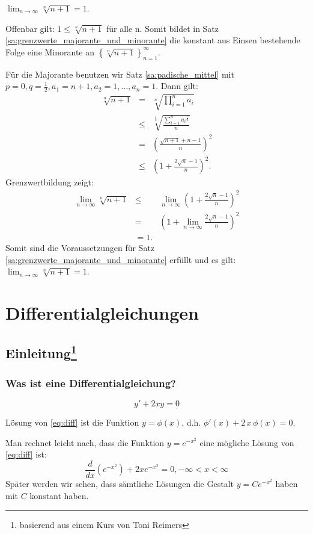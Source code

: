 \documentclass[10pt]{scrbook}
\begin{document}
\begin{Le}
$\lim_{n\rightarrow\infty} \sqrt[n]{n+1} = 1$.
\end{Le}
\begin{bew}
Offenbar gilt: $1\leq \sqrt[n]{n+1}$ für alle n. Somit bildet in Satz \ref{sa:grenzwerte_majorante_und_minorante} die konstant aus Einsen bestehende Folge eine Minorante an $\left\{\sqrt[n]{n+1}\right\}_{n=1}^\infty$.

Für die Majorante benutzen wir Satz \ref{sa:padische_mittel} mit $p=0, q=\frac{1}{2}, a_1={n+1}, a_2=1, \ldots, a_n=1$. Dann gilt:
\begin{eqnarray*}
\sqrt[n]{n+1} & = & \sqrt[n]{\prod_{i=1}^n a_i} \\
& \leq & \sqrt[\frac{1}{2}]{\frac{\sum_{i=1}^n {a_i}^{\frac{1}{2}}}{n}} \\
& = & \left(\frac{\sqrt{n+1} + n-1}{n}\right)^2 \\
& \leq & \left(1+\frac{2 \sqrt{n}-1}{n}\right)^2.
\end{eqnarray*}
Grenzwertbildung zeigt:
\begin{eqnarray*} 
\lim_{n\rightarrow\infty} \sqrt[n]{n+1} & \leq & \lim_{n\rightarrow\infty}\left(1+\frac{2 \sqrt{n}-1}{n}\right)^2 \\
& = & \left(1+\lim_{n\rightarrow\infty} \frac{2 \sqrt{n}-1}{n}\right)^2 \\
& = 1.
\end{eqnarray*}
Somit sind die Voraussetzungen für Satz \ref{sa:grenzwerte_majorante_und_minorante} erfüllt und es gilt: $\lim_{n\rightarrow\infty} \sqrt[n]{n+1} = 1$.
\end{bew}

\chapter{Differentialgleichungen}

\section[Einleitung]{Einleitung\footnote{basierend aus einem Kurs von Toni Reimers}}

\subsection{Was ist eine Differentialgleichung?}

\begin{Bsp}
\begin{equation}
y'+2 x y = 0 \label{eq:diff}
\end{equation}

Lösung von \eqref{eq:diff} ist die Funktion $y=\phi(x)$, d.h. $\phi'(x)+2\,x\,\phi(x) = 0$.

Man rechnet leicht nach, dass die Funktion $y=e^{-x^2}$ eine mögliche Lösung von \eqref{eq:diff} ist:
\begin{displaymath}
\frac{d}{dx}\left(e^{-x^2}\right) + 2 x e^{-x^2} = 0, -\infty < x < \infty
\end{displaymath}
Später werden wir sehen, dass sämtliche Lösungen die Gestalt $y=C e^{-x^2}$ haben mit $C$ konstant haben.
\end{Bsp}
\end{document}

